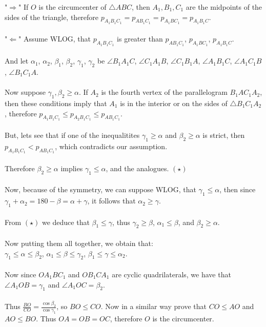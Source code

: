 "$\Rightarrow$" If $O$ is the circumcenter of $\triangle{ABC}$, then $A_1,B_1, C_1$ are the midpoints of the sides of the triangle, therefore $p_{A_1B_1C_1}=p_{AB_1C_1}= p_{A_1BC_1}= p_{A_1B_1C}$. \\\\
"$\Leftarrow$"  Assume WLOG, that $p_{A_1B_1C_1}$ is greater than $p_{AB_1C_1}$, $p_{A_1BC_1}$, $p_{A_1B_1C}$. \\\\
And let $\alpha_1$, $\alpha_2$, $\beta_1$, $\beta_2$, $\gamma_1$, $\gamma_2$ be $\angle{B_1A_1C}$, $\angle{C_1A_1B}$, $\angle{C_1B_1A}$, $\angle{A_1B_1C}$, $\angle{A_1C_1B}$, $\angle{B_1C_1A}$. \\\\
Now suppose $\gamma_1, \beta_2\geq  \alpha$. If $A_2$ is the fourth vertex of the parallelogram $B_1AC_1A_2$, then these conditions imply that $A_1$ is in the interior or on the sides of $\triangle{B_1C_1A_2}$, therefore $p_{A_1B_1C_1}\leq p_{A_2B_1C_1}\leq p_{AB_1C_1}$. \\\\
But, lets see that if one of the inequalitites $\gamma_1\geq \alpha$ and $\beta_2\geq \alpha$ is strict, then $p_{A_1B_1C_1}< p_{AB_1C_1}$, which contradicts our assumption. \\\\
Therefore $\beta_2\geq \alpha$ implies $\gamma_1\leq  \alpha$, and the analogues. $(\star)$ \\\\
Now, because of the symmetry, we can suppose WLOG, that $\gamma_1\leq \alpha$, then since $\gamma_1+\alpha_2=180-\beta=\alpha+\gamma$, it follows that $\alpha_2\geq \gamma$. \\\\
From $(\star)$ we deduce that $\beta_1\leq \gamma$, thus $\gamma_2\geq \beta$, $\alpha_1\leq \beta$, and $\beta_2\geq \alpha$. \\\\
Now putting them all together, we obtain that: \\
$\gamma_1\leq \alpha\leq \beta_2$, $\alpha_1\leq \beta\leq \gamma_2$, $\beta_1\leq \gamma\leq \alpha_2$. \\\\
Now since $OA_1BC_1$ and $OB_1CA_1$ are cyclic quadrilaterals, we have that $\angle{A_1OB}=\gamma_1$ and $\angle{A_1OC}=\beta_2$. \\\\
Thus $\frac{BO}{CO}=\frac{\cos{\beta_2}}{\cos{\gamma_1}}$, so $BO\leq CO$. Now in a similar way prove that $CO \leq  AO$ and $AO \leq  BO$. Thus $OA=OB=OC$, therefore $O$ is the circumcenter. 
